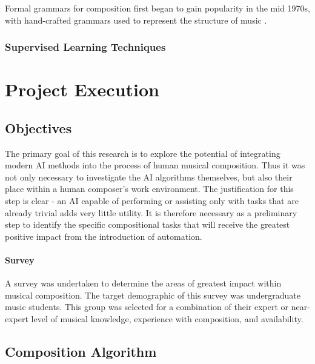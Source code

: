\documentclass[ author={Stephen Livermore-Tozer},
				supervisor={Dr. Peter Flach},
				degree={MEng},
				title={Performing Algorithmic Co-composition Using Machine Learning},
				subtitle={},
				type={research},
				year={2016} ]{dissertation}
\begin{document}
	Formal grammars for composition first began to gain popularity in the mid 1970s, with hand-crafted grammars used to represent the structure of music \cite{lidov1973melody}\cite{rader1974method}. 
	
	\subsection{Supervised Learning Techniques}
	\label{sec:supervised-techniques}
	
	
	\chapter{Project Execution}
	\label{chap:execution}
	
	\section{Objectives}
	
	The primary goal of this research is to explore the potential of integrating modern AI methods into the process of human musical composition. Thus it was not only necessary to investigate the AI algorithms themselves, but also their place within a human composer's work environment. The justification for this step is clear - an AI capable of performing or assisting only with tasks that are already trivial adds very little utility. It is therefore necessary as a preliminary step to identify the specific compositional tasks that will receive the greatest positive impact from the introduction of automation.
	
	\subsubsection{Survey}
	
	
	A survey was undertaken to determine the areas of greatest impact within musical composition. The target demographic of this survey was undergraduate music students. This group was selected for a combination of their expert or near-expert level of musical knowledge, experience with composition, and availability. 
	
	\section{Composition Algorithm}
	
\end{document}

